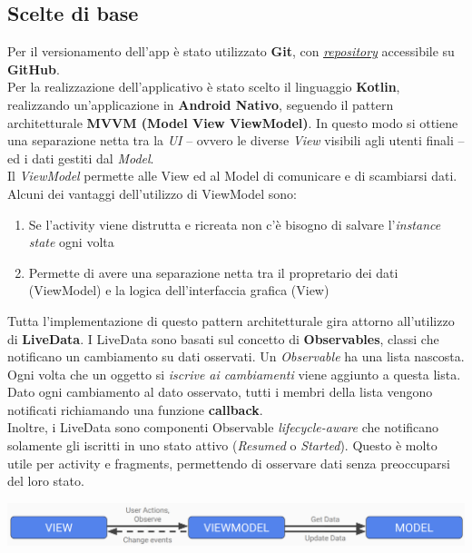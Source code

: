 \documentclass{article}
\begin{document}
\subsection*{Scelte di base}
\large

Per il versionamento dell'app è stato utilizzato \textbf{Git}, con \href{https://github.com/DavideDeRosa/ProgettoLAM}{\underline{\textit{repository}}} accessibile su \textbf{GitHub}.\vspace*{14pt}\\
Per la realizzazione dell'applicativo è stato scelto il linguaggio \textbf{Kotlin}, realizzando un'applicazione in \textbf{Android Nativo}, seguendo il pattern architetturale \textbf{MVVM (Model View ViewModel)}. In questo modo si ottiene una separazione netta tra la \textit{UI} -- ovvero le diverse \textit{View} visibili agli utenti finali -- ed i dati gestiti dal \textit{Model}.\\
Il \textit{ViewModel} permette alle View ed al Model di comunicare e di scambiarsi dati. Alcuni dei vantaggi dell'utilizzo di ViewModel sono:
\begin{enumerate}
    \itemsep0em
    \renewcommand*{\labelenumi}{-}
    \item Se l'activity viene distrutta e ricreata non c'è bisogno di salvare l'\textit{instance state} ogni volta
    \item Permette di avere una separazione netta tra il propretario dei dati (ViewModel) e la logica dell'interfaccia grafica (View)
\end{enumerate}
Tutta l'implementazione di questo pattern architetturale gira attorno all'utilizzo di \textbf{LiveData}. I LiveData sono basati sul concetto di \textbf{Observables}, classi che notificano un cambiamento su dati osservati. Un \textit{Observable} ha una lista nascosta. Ogni volta che un oggetto si \textit{iscrive ai cambiamenti} viene aggiunto a questa lista. Dato ogni cambiamento al dato osservato, tutti i membri della lista vengono notificati richiamando una funzione \textbf{callback}.\vspace*{14pt}\\
Inoltre, i LiveData sono componenti Observable \textit{lifecycle-aware} che notificano solamente gli iscritti in uno stato attivo (\textit{Resumed} o \textit{Started}). Questo è molto utile per activity e fragments, permettendo di osservare dati senza preoccuparsi del loro stato.
\begin{center}
    {\includegraphics[width=1\textwidth]{mvvm.png}}
\end{center}
\end{document}
